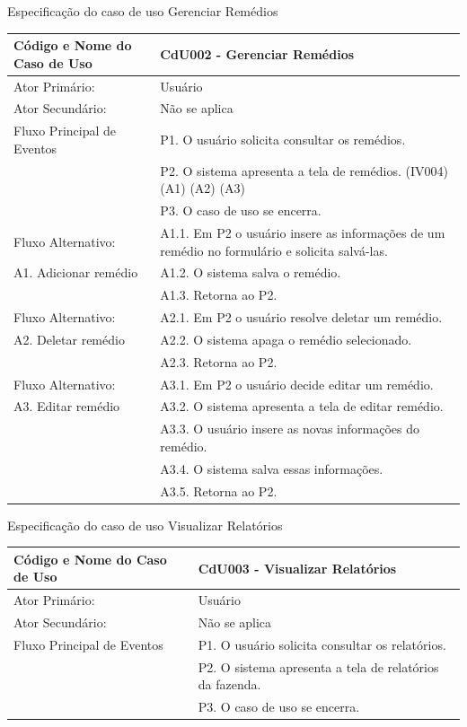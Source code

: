 \documentclass[12pt]{article}
\begin{document}
	\begin{center}
		\caption{Especificação do caso de uso Gerenciar Remédios}
		\begin{tabular}{ | l |  p{10cm} |}
			\hline
			Código e Nome do Caso de Uso & CdU002 - Gerenciar Remédios \\ \hline
			Ator Primário: & Usuário \\ 
			Ator Secundário: & Não se aplica \\ \hline
			Fluxo Principal de Eventos & P1. O usuário solicita consultar os remédios. \\
						   & P2. O sistema apresenta a tela de remédios. (IV004) (A1) (A2) (A3) \\
						   & P3. O caso de uso se encerra. \\ \hline
			Fluxo Alternativo:         & A1.1. Em P2 o usuário insere as informações de um remédio no formulário e solicita salvá-las. \\
			A1. Adicionar remédio      & A1.2. O sistema salva o remédio. \\ 
						   & A1.3. Retorna ao P2. \\ \hline
			Fluxo Alternativo:         & A2.1. Em P2 o usuário resolve deletar um remédio. \\
			A2. Deletar remédio        & A2.2. O sistema apaga o remédio selecionado. \\
						   & A2.3. Retorna ao P2. \\ \hline
			Fluxo Alternativo:         & A3.1. Em P2 o usuário decide editar um remédio. \\
			A3. Editar remédio         & A3.2. O sistema apresenta a tela de editar remédio. \\
						   & A3.3. O usuário insere as novas informações do remédio. \\
						   & A3.4. O sistema salva essas informações. \\
						   & A3.5. Retorna ao P2. \\
			\hline
		\end{tabular}
	\end{center}


	\begin{center}
		\caption{Especificação do caso de uso Visualizar Relatórios}
		\begin{tabular}{ | l |  p{10cm} |}
			\hline
			Código e Nome do Caso de Uso & CdU003 - Visualizar Relatórios \\ \hline
			Ator Primário: & Usuário \\ 
			Ator Secundário: & Não se aplica \\ \hline
			Fluxo Principal de Eventos & P1. O usuário solicita consultar os relatórios. \\
						   & P2. O sistema apresenta a tela de relatórios da fazenda. \\
						   & P3. O caso de uso se encerra. \\
			\hline
		\end{tabular}
	\end{center}
\end{document}
